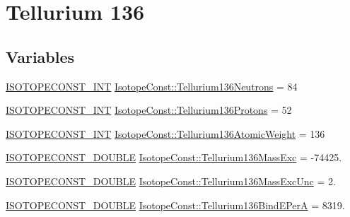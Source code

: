 \hypertarget{group___isotope_const-_tellurium-_te136}{}\section{Tellurium 136}
\label{group___isotope_const-_tellurium-_te136}
\subsection*{Variables}
\begin{DoxyCompactItemize}
\item 
\mbox{\hyperlink{group___isotope_const-_macros_ga5f18360b3e99483a35c32d789e62621c}{I\+S\+O\+T\+O\+P\+E\+C\+O\+N\+S\+T\+\_\+\+I\+NT}} \mbox{\hyperlink{group___isotope_const-_tellurium-_te136_ga63e967b19a8f7df0996005650f4bac78}{Isotope\+Const\+::\+Tellurium136\+Neutrons}} = 84
\item 
\mbox{\hyperlink{group___isotope_const-_macros_ga5f18360b3e99483a35c32d789e62621c}{I\+S\+O\+T\+O\+P\+E\+C\+O\+N\+S\+T\+\_\+\+I\+NT}} \mbox{\hyperlink{group___isotope_const-_tellurium-_te136_gac2575954059ee49ea954448fda9e04d1}{Isotope\+Const\+::\+Tellurium136\+Protons}} = 52
\item 
\mbox{\hyperlink{group___isotope_const-_macros_ga5f18360b3e99483a35c32d789e62621c}{I\+S\+O\+T\+O\+P\+E\+C\+O\+N\+S\+T\+\_\+\+I\+NT}} \mbox{\hyperlink{group___isotope_const-_tellurium-_te136_ga75347c59cf10705ada50d5fb8f3d7e2b}{Isotope\+Const\+::\+Tellurium136\+Atomic\+Weight}} = 136
\item 
\mbox{\hyperlink{group___isotope_const-_macros_ga8f45a7272ce02c0b4c65c44636ed719a}{I\+S\+O\+T\+O\+P\+E\+C\+O\+N\+S\+T\+\_\+\+D\+O\+U\+B\+LE}} \mbox{\hyperlink{group___isotope_const-_tellurium-_te136_gadefb60bc350c858d2cb6aab70d2eddb1}{Isotope\+Const\+::\+Tellurium136\+Mass\+Exc}} = -\/74425.
\item 
\mbox{\hyperlink{group___isotope_const-_macros_ga8f45a7272ce02c0b4c65c44636ed719a}{I\+S\+O\+T\+O\+P\+E\+C\+O\+N\+S\+T\+\_\+\+D\+O\+U\+B\+LE}} \mbox{\hyperlink{group___isotope_const-_tellurium-_te136_ga6f806a8f46637f9ec55e94b8cbb38e70}{Isotope\+Const\+::\+Tellurium136\+Mass\+Exc\+Unc}} = 2.
\item 
\mbox{\hyperlink{group___isotope_const-_macros_ga8f45a7272ce02c0b4c65c44636ed719a}{I\+S\+O\+T\+O\+P\+E\+C\+O\+N\+S\+T\+\_\+\+D\+O\+U\+B\+LE}} \mbox{\hyperlink{group___isotope_const-_tellurium-_te136_ga7531ace8caadb38294c3a61a236b8f08}{Isotope\+Const\+::\+Tellurium136\+Bind\+E\+PerA}} = 8319.
\item 

\end{DoxyCompactItemize}
